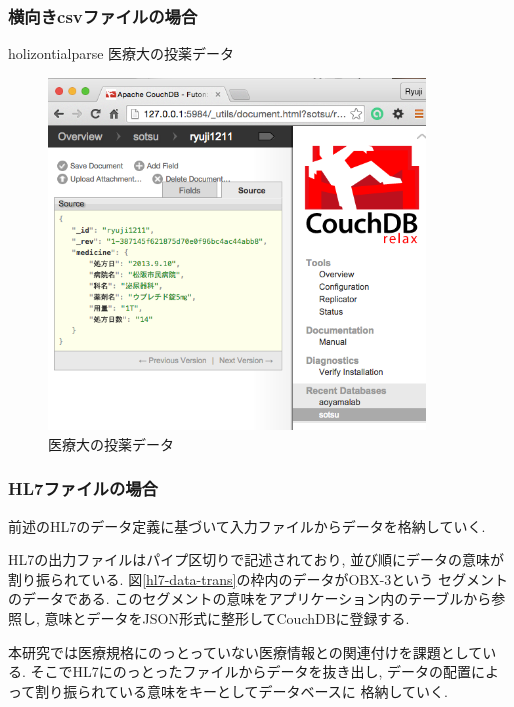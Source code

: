 		\subsubsection{横向きcsvファイルの場合}
			holizontialparse
			医療大の投薬データ
		\fi


			\begin{figure}[htbp]
				\begin{center}
					\includegraphics[width=10cm, bb=0 0 576 573]{./gazou/touyaku-data.png}
				\end{center}
				\caption{医療大の投薬データ}
				\label{iryoudai-touyaku-data}
			\end{figure}

		\subsubsection{HL7ファイルの場合}
			前述のHL7のデータ定義に基づいて入力ファイルからデータを格納していく.

			HL7の出力ファイルはパイプ区切りで記述されており,
			並び順にデータの意味が割り振られている.
			図\ref{hl7-data-trans}の枠内のデータがOBX-3という
			セグメントのデータである.
			このセグメントの意味をアプリケーション内のテーブルから参照し,
			意味とデータをJSON形式に整形してCouchDBに登録する.



			本研究では医療規格にのっとっていない医療情報との関連付けを課題としている.
			そこでHL7にのっとったファイルからデータを抜き出し,
			データの配置によって割り振られている意味をキーとしてデータベースに
			格納していく.

